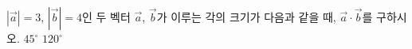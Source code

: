 $|\vec{a}|=3$, $|\vec{b}|=4$인 두 벡터 $\vec{a}$, $\vec{b}$가 이루는 각의 크기가 다음과 같을 때, $\vec{a}\cdot\vec{b}$를 구하시오.
 $45^\circ$
 $120^\circ$
